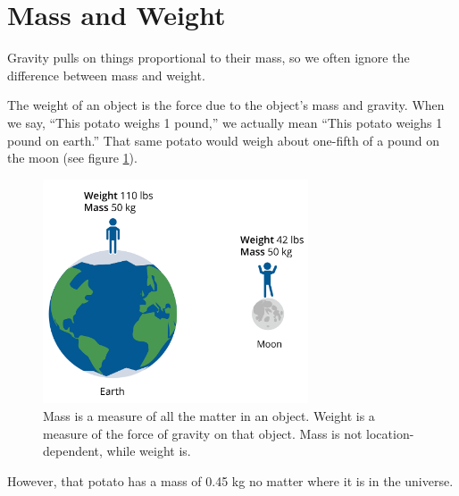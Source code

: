 \section{Mass and Weight}

Gravity pulls on things proportional to their mass, so we often
ignore the difference between mass and weight.

The weight of an object is the force due to the object's mass and
gravity. When we say, ``This potato weighs 1 pound,'' we actually mean
``This potato weighs 1 pound on earth.'' That same potato would weigh
about one-fifth of a pound on the moon (see figure \ref{fig:massvweight}).

\begin{figure}[htbp]
\centering
\includegraphics[width=0.7\textwidth]{massvweight.png}
\caption{Mass is a measure of all the matter in an object. Weight is a measure of 
the force of gravity on that object. Mass is not location-dependent, while weight 
is.}
\label{fig:massvweight}
\end{figure}

However, that potato has a mass of 0.45 kg no matter where it is in the universe.